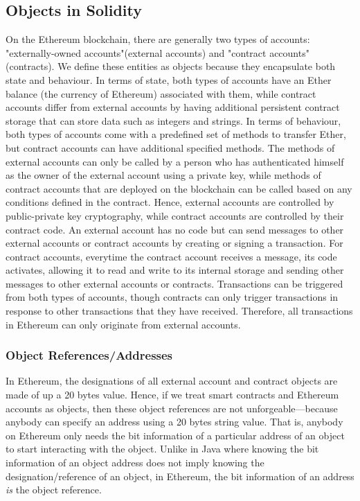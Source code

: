 \documentclass[a4paper,11pt,twoside]{article}
\begin{document}
{\subsection{Objects in Solidity}
On the Ethereum blockchain, there are generally two types of accounts: "externally-owned accounts"(external accounts)  and "contract accounts"(contracts). We define these entities as objects because they encapsulate both state and behaviour. In terms of state, both types of accounts have an Ether balance (the currency of Ethereum) associated with them, while contract accounts differ from external accounts by having additional persistent contract storage that can store data such as integers and strings. In terms of behaviour, both types of accounts come with a predefined set of methods to transfer Ether, but contract accounts can have additional specified methods. The methods of external accounts can only be called by a person who has authenticated himself as the owner of the external account using a private key, while methods of contract accounts that are deployed on the blockchain can be called based on any conditions defined in the contract.
Hence, external accounts are controlled by public-private key cryptography, while contract accounts are controlled by their contract code. An external account has no code but can send messages to other external accounts or contract accounts by creating or signing a transaction. For contract accounts, everytime the contract account receives a message, its code activates, allowing it to read and write to its internal storage and sending other messages to other external accounts or contracts. Transactions can be triggered from both types of accounts, though contracts can only trigger transactions in response to other transactions that they have received. Therefore, all transactions in Ethereum can only originate from external accounts.

\subsubsection{Object References/Addresses} In Ethereum, the designations of all external account and contract objects are made of up a 20 bytes value. Hence, if we treat smart contracts and Ethereum accounts as objects, then these object references are not unforgeable---because anybody can specify an address using a 20 bytes string value. That is, anybody on Ethereum only needs the bit information of a particular address of an object to start interacting with the object. Unlike in Java where knowing the bit information of an object address does not imply knowing the designation/reference of an object, in Ethereum, the bit information of an address \textit{is} the object reference.

}
\end{document}
